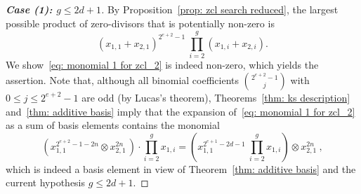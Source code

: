 \documentclass[amscd,amssymb,verbatim,10pt]{amsart}
\numberwithin{equation}{section}
\theoremstyle{plain}
\theoremstyle{definition}
\DeclareMathOperator{\zcl}{{\mathsf{zcl}}}
\DeclareMathOperator{\proj}{{\textup{proj}}}
\begin{document}
\begin{proof}[\textbf{Case (1): $g\le 2d+1$}]
By Proposition~\ref{prop: zcl search reduced}, the largest possible product of zero-divisors that is potentially non-zero is
\begin{equation}\label{eq: monomial 1 for zcl_2}
\left(x_{1,1}+x_{2,1}\right)^{2^{e+2}-1}\ \prod_{i=2}^g \left(x_{1,i}+x_{2,i}\right).
\end{equation}
We show~\eqref{eq: monomial 1 for zcl_2} is indeed non-zero, which yields the assertion. Note that, although all binomial coefficients $2^{e+2}-1 \choose j$ with $0\leq j\leq 2^{e+2}-1$ are odd (by Lucas's theorem), Theorems~\ref{thm: ks description} and~\ref{thm: additive basis} imply that the expansion of~\eqref{eq: monomial 1 for zcl_2} as a sum of basis elements contains the monomial 
\[
\left(x_{1,1}^{2^{e+2}-1-2n}\otimes x_{2,1}^{2n} \,\right)\cdot \prod_{i=2}^g x_{1,i}
=\left(x_{1,1}^{2^{e+1}-2d-1}\ \prod_{i=2}^g x_{1,i}\right)\otimes x_{2,1}^{2n} \ ,  
\]
which is indeed a basis element in view of Theorem~\ref{thm: additive basis} and the current hypothesis $g\leq 2d+1$.
\end{proof}
\end{document}

